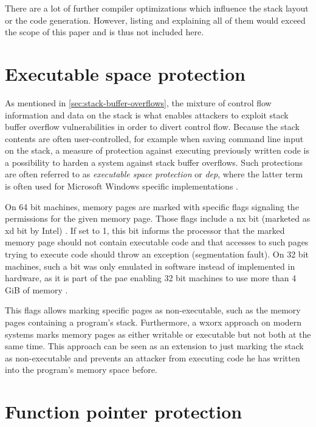 There are a lot of further compiler optimizations which influence the stack layout or the code generation.
However, listing and explaining all of them would exceed the scope of this paper and is thus not included here.

\section{Executable space protection}
\label{sec:executable-space-protection}

As mentioned in \cref{sec:stack-buffer-overflows}, the mixture of control flow information and data on the stack is what enables attackers to exploit stack buffer overflow vulnerabilities in order to divert control flow.
Because the stack contents are often user-controlled, for example when saving command line input on the stack, a measure of protection against executing previously written code is a possibility to harden a system against stack buffer overflows.
Such protections are often referred to as \emph{executable space protection} or \emph{\gls{dep}}, where the latter term is often used for Microsoft Windows specific implementations \cite{Satran2018}.

On 64 bit machines, memory pages are marked with specific flags signaling the permissions for the given memory page.
Those flags include a \gls{nx} bit (marketed as \gls{xd} bit by Intel) \cite[801\psq]{Bryant2011}.
If set to 1, this bit informs the processor that the marked memory page should not contain executable code and that accesses to such pages trying to execute code should throw an exception (segmentation fault).
On 32 bit machines, such a bit was only emulated in software instead of implemented in hardware, as it is part of the \gls{pae} enabling 32 bit machines to use more than 4 GiB of memory \cite{Molnar2004}.

This flags allows marking specific pages as non-executable, such as the memory pages containing a program's stack.
Furthermore, a \gls{wxorx} approach on modern systems marks memory pages as either writable or executable but not both at the same time.
This approach can be seen as an extension to just marking the stack as non-executable and prevents an attacker from executing code he has written into the program's memory space before.

\section{Function pointer protection}
\label{sec:function-pointer-protection}

